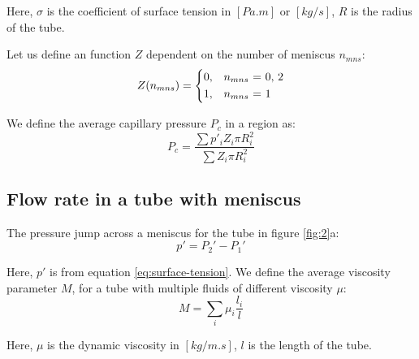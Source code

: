 \documentclass[
	12pt
] {article}
\begin{document}
	Here, $\sigma$ is the coefficient of surface tension in $[Pa.m]$ or $[kg/s]$, $R$ is the radius of the tube.
	
	Let us define an function $Z$ dependent on the number of meniscus $n_{mns}$:
	\begin{equation} \label{eq:average-capillary-pressure-sign}
		Z(n_{mns}) = 
		\begin{dcases}
			0,&\text{$n_{mns}$ = 0, 2}\\
			1,&\text{$n_{mns}$ = 1}\\
		\end{dcases}
	\end{equation}
	
	We define the average capillary pressure $P_c$ in a region as:
	\begin{equation} \label{eq:average-capillary-pressure}
		P_c = \frac{\sum p'_i Z_i \pi R_i^2}{\sum Z_i \pi R_i^2}
	\end{equation}
	
\subsection{Flow rate in a tube with meniscus}
	The pressure jump across a meniscus for the tube in figure \ref{fig:2}a:
	\begin{equation} \label{eq:pressure-jump-def} 
		 p' = P_{2}' - P_{1}'
	\end{equation}
	
	Here, $p'$ is from equation \ref{eq:surface-tension}.
	We define the average viscosity parameter $M$, for a tube with multiple fluids of different viscosity $\mu$:
	\begin{equation} \label{eq:def-average-viscosity}
		M = \sum_{i} \mu_{i} \frac{l_{i}}{l}
	\end{equation}
	
	Here, $\mu$ is the dynamic viscosity in $[kg/m.s]$, $l$ is the length of the tube.
	
\end{document}
